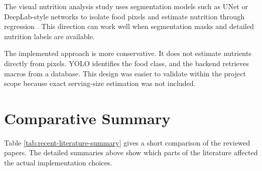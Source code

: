 The visual nutrition analysis study uses segmentation models such as UNet or DeepLab-style networks to isolate food pixels and estimate nutrition through regression \cite{visual_nutrition_analysis_2024}. This direction can work well when segmentation masks and detailed nutrition labels are available.

The implemented approach is more conservative. It does not estimate nutrients directly from pixels. YOLO identifies the food class, and the backend retrieves macros from a database. This design was easier to validate within the project scope because exact serving-size estimation was not included.

\section{Comparative Summary}

Table \ref{tab:recent-literature-summary} gives a short comparison of the reviewed papers. The detailed summaries above show which parts of the literature affected the actual implementation choices.

